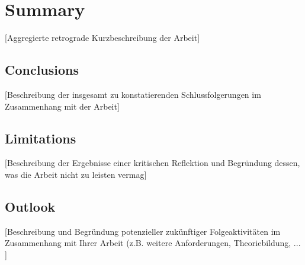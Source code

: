 \documentclass[oneside,bibliography=totocnumbered,BCOR=5mm]{scrbook}%
\theoremstyle{definition}
\theoremstyle{definition}
\theoremstyle{definition}
\theoremstyle{definition}
\theoremstyle{definition}
\theoremstyle{definition}
\begin{document}
\chapter{Summary}
[Aggregierte retrograde Kurzbeschreibung der Arbeit]
\section{Conclusions}
[Beschreibung der insgesamt zu konstatierenden Schlussfolgerungen im Zusammenhang mit der Arbeit]
\section{Limitations}
[Beschreibung der Ergebnisse einer kritischen Reflektion und Begr\"undung dessen, was die Arbeit nicht zu leisten vermag]
\section{Outlook}
[Beschreibung und Begr\"undung potenzieller zuk\"unftiger Folgeaktivit\"aten im Zusammenhang mit Ihrer Arbeit (z.B. weitere Anforderungen, Theoriebildung, ... ]


























% 
%  

\end{document}
